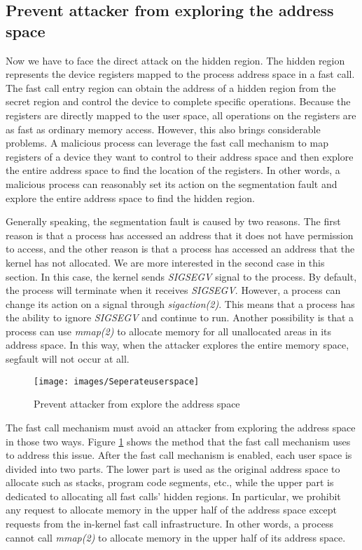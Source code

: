 \subsection{Prevent attacker from exploring the address space}
Now we have to face the direct attack on the hidden region. 
The hidden region represents the device registers mapped to the
 process address space\cite{10.5555/983550} in a fast call. The fast call entry region 
 can obtain the address of a  hidden region from the secret region and
  control the device to complete specific operations. Because the 
  registers are directly mapped to the user space, all operations 
  on the registers are as fast as ordinary memory access. However, 
  this also brings considerable problems. A malicious process can 
  leverage the fast call mechanism to map registers of a device 
  they want to control to their address space and then explore the 
  entire address space to find the location of the registers. 
  In other words, a malicious process can reasonably set its 
  action on the segmentation fault\cite{21} and explore the entire address space to find the hidden region.

Generally speaking, the segmentation fault is caused by two reasons. 
The first reason is that a process has accessed an address 
that it does not have permission to access, and the other 
reason is that a process has accessed an address that the 
kernel has not allocated. We are more interested in the 
second case in this section. In this case, the kernel sends 
\emph{SIGSEGV}\cite{21} signal to the process. By default,  the process will 
terminate when it receives \emph{SIGSEGV}.  However, a process can 
change its action on a signal through \emph{sigaction(2)}\cite{20}. This 
means that a process has the ability to ignore \emph{SIGSEGV} 
and continue to run. Another possibility is that a process 
can use \emph{mmap(2)}\cite{22} to allocate memory for all unallocated 
areas in its address space. In this way, when the attacker 
explores the entire memory space, segfault will not occur at all.

\begin{figure}[H]
  \centering
  \texttt{[image: images/Seperateuserspace]}
  \caption[Short description]{Prevent attacker from explore the address space}
  \label{fig:Seperateuserspace}
\end{figure}


The fast call mechanism must avoid an attacker from exploring 
the address space in those two ways. Figure \ref{fig:Seperateuserspace} 
shows the method that the fast call mechanism uses to address this issue. 
After the fast call mechanism is enabled, each user space is divided into
two parts. The lower part is used as the original address space to 
allocate such as stacks, program code segments, etc., while the upper 
part is dedicated to allocating all fast calls' hidden regions. 
In particular, we prohibit any request to allocate memory in the 
upper half of the address space except requests from the in-kernel 
fast call infrastructure. In other words, a process cannot call \emph{mmap(2)} 
to allocate memory in the upper half of its address space.

